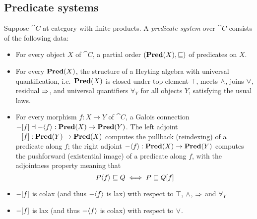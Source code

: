 \subsection{Predicate systems}
\label{sec:predicate-system}

Suppose $\cat{C}$ at category with finite products. A \emph{predicate system} over $\cat{C}$ consists of the
following data:
\begin{itemize}
\item For every object $X$ of $\cat{C}$, a partial order $(\mathbf{Pred}(X), \sqsubseteq)$ of predicates on $X$.
\item For every $\mathbf{Pred}(X)$, the structure of a Heyting algebra  with universal
   quantification, i.e.~$\mathbf{Pred}(X)$ is closed under top element $\top$, meets $\wedge$, joins $\vee$, residual
   $\Rightarrow$, and universal quantifiers $\forall_Y$ for all objects $Y$, satisfying the usual laws.
\item For every morphism $f: X \to Y$ of $\cat{C}$, a Galois connection $-[f] \dashv
-\langle f\rangle : \mathbf{Pred}(X) \to \mathbf{Pred}(Y)$. The left adjoint $-[f]: \mathbf{Pred}(Y) \to \mathbf{Pred}(X)$ computes
the pullback (reindexing) of a predicate along $f$; the right adjoint $-\langle f\rangle: \mathbf{Pred}(X) \to
\mathbf{Pred}(Y)$ computes the pushforward (existential image) of a predicate along $f$, with the adjointness property
meaning that
\[P\langle f\rangle \sqsubseteq Q \iff P \sqsubseteq Q[f] \]
\item $-[f]$ is colax (and thus $-\langle f\rangle$ is lax) with respect to $\top$, $\wedge$,
$\Rightarrow$ and $\forall_Y$
\item $-[f]$ is lax (and thus $-\langle f\rangle$ is colax) with respect to $\vee$.
\end{itemize}
